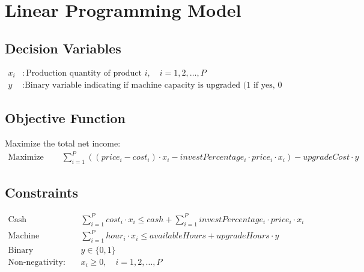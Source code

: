 \documentclass{article}
\begin{document}
\section*{Linear Programming Model}

\subsection*{Decision Variables}
\begin{align*}
x_i &: \text{Production quantity of product } i, \quad i = 1, 2, \ldots, P \\
y &: \text{Binary variable indicating if machine capacity is upgraded (1 if yes, 0 otherwise)}
\end{align*}

\subsection*{Objective Function}
Maximize the total net income:
\begin{align*}
\text{Maximize } & \quad \sum_{i=1}^{P} \left( (price_i - cost_i) \cdot x_i - investPercentage_i \cdot price_i \cdot x_i \right) - upgradeCost \cdot y
\end{align*}

\subsection*{Constraints}
\begin{align*}
\text{Cash Constraint: } & \quad \sum_{i=1}^{P} cost_i \cdot x_i \leq cash + \sum_{i=1}^{P} investPercentage_i \cdot price_i \cdot x_i \\
\text{Machine Capacity Constraint: } & \quad \sum_{i=1}^{P} hour_i \cdot x_i \leq availableHours + upgradeHours \cdot y \\
\text{Binary Constraint: } & \quad y \in \{0, 1\} \\
\text{Non-negativity: } & \quad x_i \geq 0, \quad i = 1, 2, \ldots, P
\end{align*}
\end{document}
